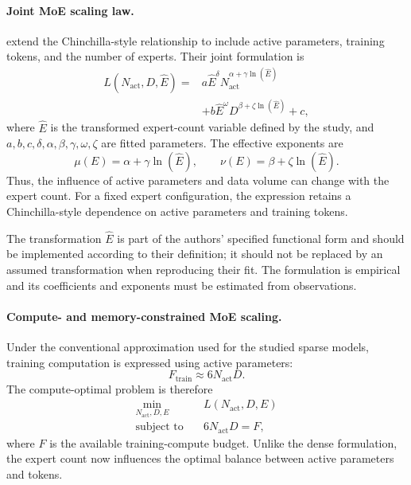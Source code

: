 \paragraph{Joint MoE scaling law.}
\textcite{Ludziejewski2025JointMoE} extend the Chinchilla-style relationship
to include active parameters, training tokens, and the number of experts.
Their joint formulation is
\begin{align}
    L(N_{\mathrm{act}},D,\widehat{E})
    ={}&
    a\widehat{E}^{\delta}
    N_{\mathrm{act}}^{\alpha+\gamma\ln(\widehat{E})}
    \nonumber\\
    &+
    b\widehat{E}^{\omega}
    D^{\beta+\zeta\ln(\widehat{E})}
    +c,
    \label{eq:scaling-joint-moe}
\end{align}
where \(\widehat{E}\) is the transformed expert-count variable defined by
the study, and \(a,b,c,\delta,\alpha,\beta,\gamma,\omega,\zeta\) are fitted
parameters. The effective exponents are
\begin{equation}
    \mu(E)=\alpha+\gamma\ln(\widehat{E}),
    \qquad
    \nu(E)=\beta+\zeta\ln(\widehat{E}).
    \label{eq:scaling-moe-effective-exponents}
\end{equation}
Thus, the influence of active parameters and data volume can change with
the expert count. For a fixed expert configuration, the expression retains
a Chinchilla-style dependence on active parameters and training tokens.

The transformation \(\widehat{E}\) is part of the authors' specified
functional form and should be implemented according to their definition;
it should not be replaced by an assumed transformation when reproducing
their fit. The formulation is empirical and its coefficients and exponents
must be estimated from observations.

\paragraph{Compute- and memory-constrained MoE scaling.}
Under the conventional approximation used for the studied sparse models,
training computation is expressed using active parameters:
\begin{equation}
    F_{\mathrm{train}}
    \approx 6N_{\mathrm{act}}D.
    \label{eq:scaling-moe-flops}
\end{equation}
The compute-optimal problem is therefore
\begin{equation}
    \begin{aligned}
        \min_{N_{\mathrm{act}},D,E}\quad
        &L(N_{\mathrm{act}},D,E)\\
        \text{subject to}\quad
        &6N_{\mathrm{act}}D=F,
    \end{aligned}
    \label{eq:scaling-moe-compute-opt}
\end{equation}
where \(F\) is the available training-compute budget. Unlike the dense
formulation, the expert count now influences the optimal balance between
active parameters and tokens.

